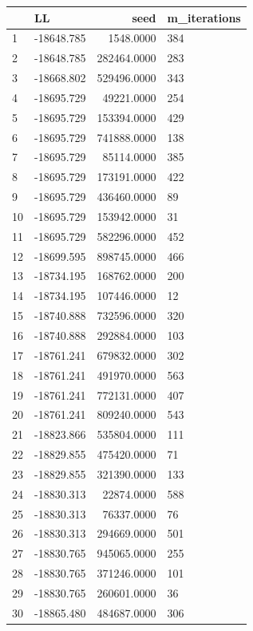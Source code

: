 \documentclass[]{book}
\theoremstyle{definition}
\theoremstyle{definition}
\theoremstyle{definition}
\theoremstyle{remark}
\begin{document}
\begin{tabular}{l|l|r|l}
\hline
  & LL & seed & m\_iterations\\
\hline
1 & -18648.785 & 1548.0000 & 384\\
\hline
2 & -18648.785 & 282464.0000 & 283\\
\hline
3 & -18668.802 & 529496.0000 & 343\\
\hline
4 & -18695.729 & 49221.0000 & 254\\
\hline
5 & -18695.729 & 153394.0000 & 429\\
\hline
6 & -18695.729 & 741888.0000 & 138\\
\hline
7 & -18695.729 & 85114.0000 & 385\\
\hline
8 & -18695.729 & 173191.0000 & 422\\
\hline
9 & -18695.729 & 436460.0000 & 89\\
\hline
10 & -18695.729 & 153942.0000 & 31\\
\hline
11 & -18695.729 & 582296.0000 & 452\\
\hline
12 & -18699.595 & 898745.0000 & 466\\
\hline
13 & -18734.195 & 168762.0000 & 200\\
\hline
14 & -18734.195 & 107446.0000 & 12\\
\hline
15 & -18740.888 & 732596.0000 & 320\\
\hline
16 & -18740.888 & 292884.0000 & 103\\
\hline
17 & -18761.241 & 679832.0000 & 302\\
\hline
18 & -18761.241 & 491970.0000 & 563\\
\hline
19 & -18761.241 & 772131.0000 & 407\\
\hline
20 & -18761.241 & 809240.0000 & 543\\
\hline
21 & -18823.866 & 535804.0000 & 111\\
\hline
22 & -18829.855 & 475420.0000 & 71\\
\hline
23 & -18829.855 & 321390.0000 & 133\\
\hline
24 & -18830.313 & 22874.0000 & 588\\
\hline
25 & -18830.313 & 76337.0000 & 76\\
\hline
26 & -18830.313 & 294669.0000 & 501\\
\hline
27 & -18830.765 & 945065.0000 & 255\\
\hline
28 & -18830.765 & 371246.0000 & 101\\
\hline
29 & -18830.765 & 260601.0000 & 36\\
\hline
30 & -18865.480 & 484687.0000 & 306\\

\end{tabular}
\end{document}
